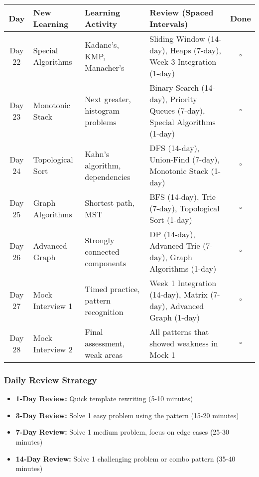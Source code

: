 \documentclass[10pt,a4paper]{article}
\begin{document}
\begin{table}[h]
\centering
\small
\begin{tabular}{|c|p{3cm}|p{4cm}|p{4cm}|c|}
\hline
\textbf{Day} & \textbf{New Learning} & \textbf{Learning Activity} & \textbf{Review (Spaced Intervals)} & \textbf{Done} \\
\hline
Day 22 & Special Algorithms & Kadane's, KMP, Manacher's & Sliding Window (14-day), Heaps (7-day), Week 3 Integration (1-day) & $\square$ \\
\hline
Day 23 & Monotonic Stack & Next greater, histogram problems & Binary Search (14-day), Priority Queues (7-day), Special Algorithms (1-day) & $\square$ \\
\hline
Day 24 & Topological Sort & Kahn's algorithm, dependencies & DFS (14-day), Union-Find (7-day), Monotonic Stack (1-day) & $\square$ \\
\hline
Day 25 & Graph Algorithms & Shortest path, MST & BFS (14-day), Trie (7-day), Topological Sort (1-day) & $\square$ \\
\hline
Day 26 & Advanced Graph & Strongly connected components & DP (14-day), Advanced Trie (7-day), Graph Algorithms (1-day) & $\square$ \\
\hline
Day 27 & Mock Interview 1 & Timed practice, pattern recognition & Week 1 Integration (14-day), Matrix (7-day), Advanced Graph (1-day) & $\square$ \\
\hline
Day 28 & Mock Interview 2 & Final assessment, weak areas & All patterns that showed weakness in Mock 1 & $\square$ \\
\hline
\end{tabular}
\end{table}

\subsubsection{Daily Review Strategy}

\begin{itemize}
\item \textbf{1-Day Review:} Quick template rewriting (5-10 minutes)
\item \textbf{3-Day Review:} Solve 1 easy problem using the pattern (15-20 minutes)
\item \textbf{7-Day Review:} Solve 1 medium problem, focus on edge cases (25-30 minutes)
\item \textbf{14-Day Review:} Solve 1 challenging problem or combo pattern (35-40 minutes)
\end{itemize}
\end{document}
